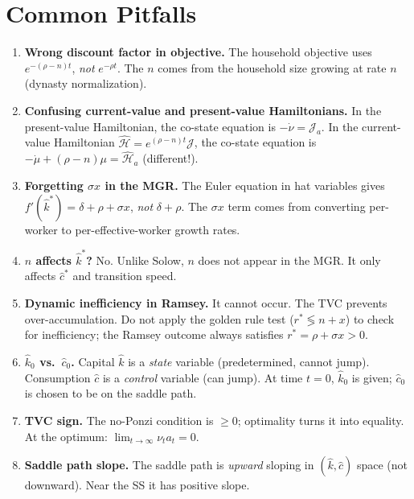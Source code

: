 \documentclass[a4paper,11pt]{article}
\newcommand{\khat}{\hat{k}}
\newcommand{\chat}{\hat{c}}
\begin{document}
\section{Common Pitfalls}

\begin{enumerate}[leftmargin=*]
  \item \textbf{Wrong discount factor in objective.} The household objective uses $e^{-(\rho-n)t}$, \emph{not} $e^{-\rho t}$. The $n$ comes from the household size growing at rate $n$ (dynasty normalization).

  \item \textbf{Confusing current-value and present-value Hamiltonians.} In the present-value Hamiltonian, the co-state equation is $-\dot{\nu} = \mathcal{J}_a$. In the current-value Hamiltonian $\hat{\mathcal{H}} = e^{(\rho-n)t}\mathcal{J}$, the co-state equation is $-\dot{\mu} + (\rho-n)\mu = \hat{\mathcal{H}}_a$ (different!).

  \item \textbf{Forgetting $\sigma x$ in the MGR.} The Euler equation in hat variables gives $f'(\khat^*) = \delta + \rho + \sigma x$, \emph{not} $\delta + \rho$. The $\sigma x$ term comes from converting per-worker to per-effective-worker growth rates.

  \item \textbf{$n$ affects $\khat^*$?} No. Unlike Solow, $n$ does not appear in the MGR. It only affects $\chat^*$ and transition speed.

  \item \textbf{Dynamic inefficiency in Ramsey.} It cannot occur. The TVC prevents over-accumulation. Do not apply the golden rule test ($r^* \lessgtr n+x$) to check for inefficiency; the Ramsey outcome always satisfies $r^* = \rho + \sigma x > 0$.

  \item \textbf{$\khat_0$ vs.\ $\chat_0$.} Capital $\khat$ is a \emph{state} variable (predetermined, cannot jump). Consumption $\chat$ is a \emph{control} variable (can jump). At time $t=0$, $\khat_0$ is given; $\chat_0$ is chosen to be on the saddle path.

  \item \textbf{TVC sign.} The no-Ponzi condition is $\geq 0$; optimality turns it into equality. At the optimum: $\lim_{t\to\infty}\nu_t a_t = 0$.

  \item \textbf{Saddle path slope.} The saddle path is \emph{upward} sloping in $(\khat, \chat)$ space (not downward). Near the SS it has positive slope.
\end{enumerate}
\end{document}
